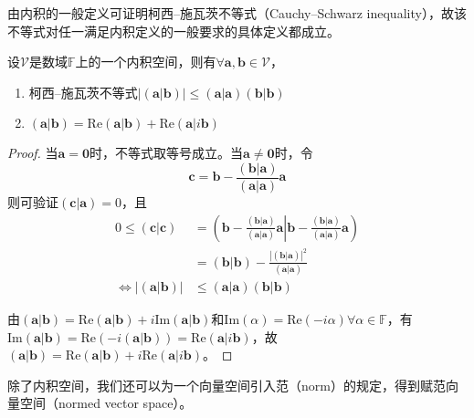 \documentclass[main.tex]{subfiles}
\begin{document}
由内积的一般定义可证明柯西--施瓦茨不等式（Cauchy--Schwarz inequality），故该不等式对任一满足内积定义的一般要求的具体定义都成立。

\begin{theorem}\label{thm:II.3.1}
设$\mathcal{V}$是数域$\mathbb{F}$上的一个内积空间，则有$\forall\mathbf{a},\mathbf{b}\in\mathcal{V}$，
\begin{enumerate}
    \item 柯西--施瓦茨不等式$\left|\left(\mathbf{a}|\mathbf{b}\right)\right|\leq\left(\mathbf{a}|\mathbf{a}\right)\left(\mathbf{b}|\mathbf{b}\right)$
    \item $\left(\mathbf{a}|\mathbf{b}\right)=\mathrm{Re}\left(\mathbf{a}|\mathbf{b}\right)+\mathrm{Re}\left(\mathbf{a}|i\mathbf{b}\right)$
\end{enumerate}
\end{theorem}
\begin{proof}
当$\mathbf{a}=\mathbf{0}$时，不等式取等号成立。当$\mathbf{a}\neq\mathbf{0}$时，令
\[
\mathbf{c}=\mathbf{b}-\frac{\left(\mathbf{b}|\mathbf{a}\right)}{\left(\mathbf{a}|\mathbf{a}\right)}\mathbf{a}
\]
则可验证$\left(\mathbf{c}|\mathbf{a}\right)=0$，且
\begin{align*}
0\leq\left(\mathbf{c}|\mathbf{c}\right)&=\left(\mathbf{b}-\frac{\left(\mathbf{b}|\mathbf{a}\right)}{\left(\mathbf{a}|\mathbf{a}\right)}\mathbf{a}\right|\left.\mathbf{b}-\frac{\left(\mathbf{b}|\mathbf{a}\right)}{\left(\mathbf{a}|\mathbf{a}\right)}\mathbf{a}\right)\\
&=\left(\mathbf{b}|\mathbf{b}\right)-\frac{\left|\left(\mathbf{b}|\mathbf{a}\right)\right|^2}{\left(\mathbf{a}|\mathbf{a}\right)}\\
\Leftrightarrow \left|\left(\mathbf{a}|\mathbf{b}\right)\right|&\leq\left(\mathbf{a}|\mathbf{a}\right)\left(\mathbf{b}|\mathbf{b}\right)
\end{align*}

由$\left(\mathbf{a}|\mathbf{b}\right)=\mathrm{Re}\left(\mathbf{a}|\mathbf{b}\right)+i\mathrm{Im}\left(\mathbf{a}|\mathbf{b}\right)$和$\mathrm{Im}\left(\alpha\right)=\mathrm{Re}\left(-i\alpha\right)\forall\alpha\in\mathbb{F}$，有$\mathrm{Im}\left(\mathbf{a}|\mathbf{b}\right)=\mathrm{Re}\left(-i\left(\mathbf{a}|\mathbf{b}\right)\right)=\mathrm{Re}\left(\mathbf{a}|i\mathbf{b}\right)$，故$\left(\mathbf{a}|\mathbf{b}\right)=\mathrm{Re}\left(\mathbf{a}|\mathbf{b}\right)+i\mathrm{Re}\left(\mathbf{a}|i\mathbf{b}\right)$。
\end{proof}

除了内积空间，我们还可以为一个向量空间引入范（norm）的规定，得到赋范向量空间（normed vector space）。
\end{document}
